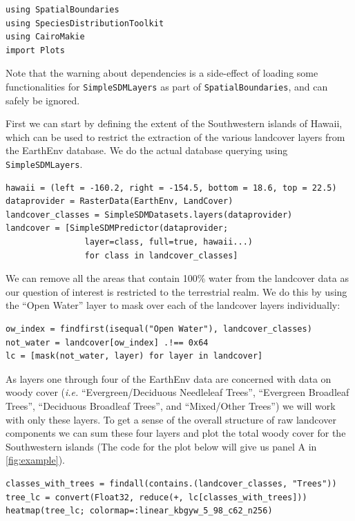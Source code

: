\begin{verbatim}
using SpatialBoundaries
using SpeciesDistributionToolkit
using CairoMakie
import Plots
\end{verbatim}

Note that the warning about dependencies is a side-effect of loading
some functionalities for \texttt{SimpleSDMLayers} as part of
\texttt{SpatialBoundaries}, and can safely be ignored.

First we can start by defining the extent of the Southwestern islands of
Hawaii, which can be used to restrict the extraction of the various
landcover layers from the EarthEnv database. We do the actual database
querying using \texttt{SimpleSDMLayers}.

\begin{verbatim}
hawaii = (left = -160.2, right = -154.5, bottom = 18.6, top = 22.5)
dataprovider = RasterData(EarthEnv, LandCover)
landcover_classes = SimpleSDMDatasets.layers(dataprovider)
landcover = [SimpleSDMPredictor(dataprovider; 
                layer=class, full=true, hawaii...) 
                for class in landcover_classes]
\end{verbatim}

We can remove all the areas that contain 100\% water from the landcover
data as our question of interest is restricted to the terrestrial realm.
We do this by using the ``Open Water'' layer to mask over each of the
landcover layers individually:

\begin{verbatim}
ow_index = findfirst(isequal("Open Water"), landcover_classes)
not_water = landcover[ow_index] .!== 0x64
lc = [mask(not_water, layer) for layer in landcover]
\end{verbatim}

As layers one through four of the EarthEnv data are concerned with data
on woody cover (\emph{i.e.} ``Evergreen/Deciduous Needleleaf Trees'',
``Evergreen Broadleaf Trees'', ``Deciduous Broadleaf Trees'', and
``Mixed/Other Trees'') we will work with only these layers. To get a
sense of the overall structure of raw landcover components we can sum
these four layers and plot the total woody cover for the Southwestern
islands (The code for the plot below will give us panel A in
\autoref{fig:example}).

\begin{verbatim}
classes_with_trees = findall(contains.(landcover_classes, "Trees"))
tree_lc = convert(Float32, reduce(+, lc[classes_with_trees]))
heatmap(tree_lc; colormap=:linear_kbgyw_5_98_c62_n256)
\end{verbatim}

